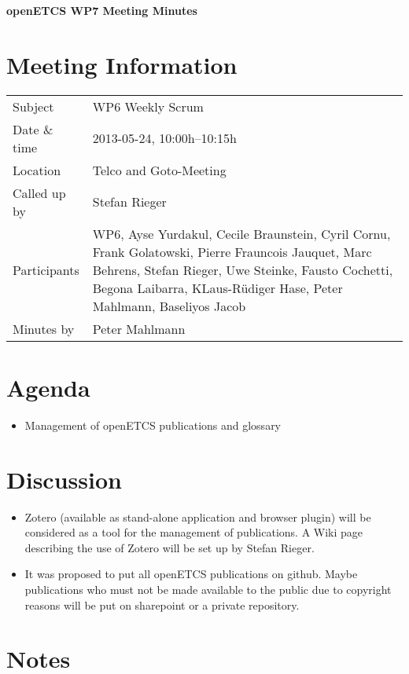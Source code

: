 \documentclass[a4paper, 11pt]{article}
\begin{document}
{\begin{center}\huge\bf openETCS WP7 Meeting Minutes\end{center}}
\section{Meeting Information}

\renewcommand{\arraystretch}{1.5}
\begin{supertabular}{m{.2\textwidth}m{.8\textwidth}}
Subject & WP6 Weekly Scrum\\
Date \& time & 2013-05-24, 10:00h--10:15h\\
Location & Telco and Goto-Meeting\\
Called up by & Stefan Rieger\\
Participants & WP6,
Ayse Yurdakul,
Cecile Braunstein,
Cyril Cornu,
Frank Golatowski,
Pierre Frauncois Jauquet,
Marc Behrens,
Stefan Rieger,
Uwe Steinke,
Fausto Cochetti,
Begona Laibarra,
KLaus-R\"udiger Hase,
Peter Mahlmann,
Baseliyos Jacob
\\


Minutes by & Peter Mahlmann\\

\end{supertabular}
\renewcommand{\arraystretch}{1.0}


\section{Agenda}
\begin{itemize}
\item Management of openETCS publications and glossary
\end{itemize}

\section{Discussion}

\begin{itemize}
\item Zotero (available as stand-alone application and browser plugin) will be considered as a tool for the management of publications. A Wiki page describing the use of Zotero will be set up by Stefan Rieger.
\item It was proposed to put all openETCS publications on github. Maybe publications who must not be made available to the public due to copyright reasons will be put on sharepoint or a private repository.

\end{itemize}

\section{Notes}
\end{document}
